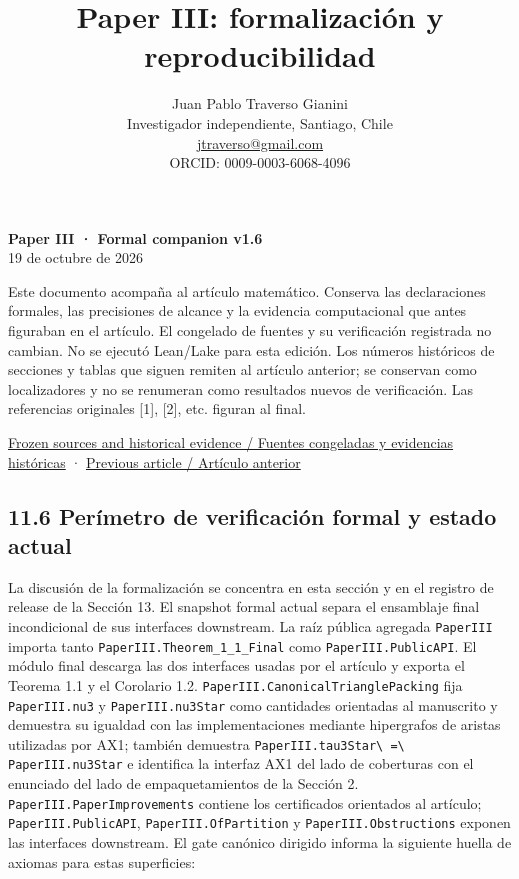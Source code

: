 \documentclass[spanish,11pt,a4paper]{article}
\title{Paper III: formalización y reproducibilidad}
\author{Juan Pablo Traverso Gianini\\\small Investigador independiente, Santiago, Chile\\\small \href{mailto:jtraverso@gmail.com}{jtraverso@gmail.com}\\\small ORCID: 0009-0003-6068-4096}
\date{}
\begin{document}
\raggedbottom
\maketitle
\textbf{Paper III · Formal companion v1.6}\\
19 de octubre de 2026

Este documento acompaña al artículo matemático. Conserva las
declaraciones formales, las precisiones de alcance y la evidencia
computacional que antes figuraban en el artículo. El congelado de
fuentes y su verificación registrada no cambian. No se ejecutó Lean/Lake
para esta edición. Los números históricos de secciones y tablas que
siguen remiten al artículo anterior; se conservan como localizadores y
no se renumeran como resultados nuevos de verificación. Las referencias
originales {[}1{]}, {[}2{]}, etc. figuran al final.

\href{https://github.com/jtraverso/erdos-81-chordal-clique-partitions/tree/eb335845bfa23375d5040ea31fc4f4b366346287/preprints/PAPER_III/05_formalization}{Frozen
sources and historical evidence / Fuentes congeladas y evidencias
históricas} ·
\href{https://github.com/jtraverso/erdos-81-chordal-clique-partitions/tree/eb335845bfa23375d5040ea31fc4f4b366346287/preprints/PAPER_III/01_manuscript}{Previous
article / Artículo anterior}

\subsection{11.6 Perímetro de verificación formal y estado
actual}\label{peruxedmetro-de-verificaciuxf3n-formal-y-estado-actual}

La discusión de la formalización se concentra en esta sección y en el
registro de release de la Sección 13. El snapshot formal actual separa
el ensamblaje final incondicional de sus interfaces downstream. La raíz
pública agregada \nolinkurl{PaperIII} importa tanto
\nolinkurl{PaperIII.Theorem_1_1_Final} como \nolinkurl{PaperIII.PublicAPI}.
El módulo final descarga las dos interfaces usadas por el artículo y
exporta el Teorema 1.1 y el Corolario 1.2.
\nolinkurl{PaperIII.CanonicalTrianglePacking} fija \nolinkurl{PaperIII.nu3} y
\nolinkurl{PaperIII.nu3Star} como cantidades orientadas al manuscrito y
demuestra su igualdad con las implementaciones mediante hipergrafos de
aristas utilizadas por AX1; también demuestra
\nolinkurl{PaperIII.tau3Star\ =\ PaperIII.nu3Star} e identifica la interfaz
AX1 del lado de coberturas con el enunciado del lado de empaquetamientos
de la Sección 2. \nolinkurl{PaperIII.PaperImprovements} contiene los
certificados orientados al artículo; \nolinkurl{PaperIII.PublicAPI},
\nolinkurl{PaperIII.OfPartition} y \nolinkurl{PaperIII.Obstructions} exponen
las interfaces downstream. El gate canónico dirigido informa la
siguiente huella de axiomas para estas superficies:
\end{document}
